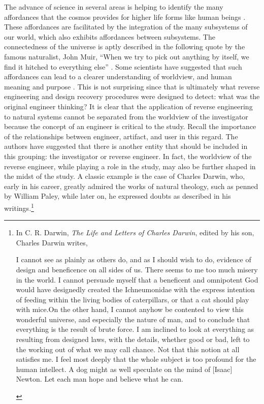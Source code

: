 The advance of science in several areas is helping to identify the many
affordances that the cosmos provides for higher life forms like human
beings . These affordances are facilitated by the
integration of the many subsystems of our world, which also exhibits
affordances between subsystems. The connectedness of the universe is
aptly described in the following quote by the famous naturalist, John
Muir, “When we try to pick out anything by itself, we find it hitched
to everything else” \citep[][p.~110]{muir1988}. Some scientists have suggested
that such affordances can lead to a clearer understanding of
worldview, and human meaning and purpose \citep{denton1998}. This is
not surprising since that is ultimately what reverse engineering and
design recovery procedures were designed to detect: what was the
original engineer thinking? It is clear that the application of reverse
engineering to natural systems cannot be separated from the worldview
of the investigator because the concept of an engineer is critical to
the study. Recall the importance of the relationships between engineer,
artifact, and user in this regard. The authors have suggested that there
is another entity that should be included in this grouping: the
investigator or reverse engineer. In fact, the worldview of the
reverse engineer, while playing a role in the study, may also be
further shaped in the midst of the study. A classic example is the case
of Charles Darwin, who, early in his career, greatly admired the works
of natural theology, such as penned by William Paley, while later on,
he expressed doubts as described in his writings.\footnote{%
In C. R. Darwin, \textit{The Life and Letters of
Charles Darwin}, edited by his son, Charles Darwin writes, 

\begin{quoting}
I cannot see as plainly as others do,
and as I should wish to do, evidence of design and beneficence on all
sides of us. There seems to me too much misery in the world.  I cannot
persuade myself that a beneficent and omnipotent God would have
designedly created the Ichneumonidae with the express intention of
feeding within the living bodies of caterpillars, or that a cat should
play with mice.{\jdots}On the other hand, I cannot anyhow be contented to view
this wonderful universe, and especially the nature of man, and to
conclude that everything is the result of brute force. I am inclined to
look at everything as resulting from designed laws, with the details,
whether good or bad, left to the working out of what we may call
chance. Not that this notion at all satisfies me. I feel most deeply
that the whole subject is too profound for the human intellect. A dog
might as well speculate on the mind of [Isaac] Newton. Let each man
hope and believe what he can. \citep[][p.~312]{darwinll} %
\end{quoting}
}

